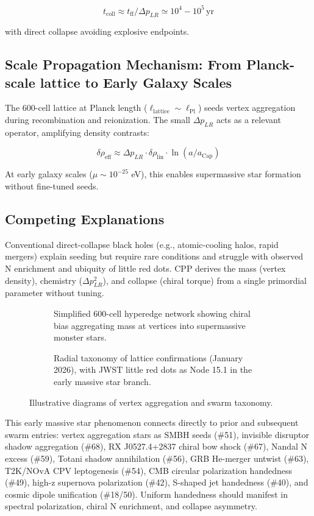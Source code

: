 \documentclass[11pt]{article}
\begin{document}
\[
t_{\text{coll}} \approx t_{\text{ff}} / \Delta p_{LR} \simeq 10^4 - 10^5 \, \text{yr}
\]

with direct collapse avoiding explosive endpoints.

\subsection{Scale Propagation Mechanism: From Planck-scale lattice to Early Galaxy Scales}
The 600-cell lattice at Planck length ($\ell_{\text{lattice}} \sim \ell_{\text{Pl}}$) seeds vertex aggregation during recombination and reionization. The small $\Delta p_{LR}$ acts as a relevant operator, amplifying density contrasts:

\[
\delta \rho_{\text{eff}} \approx \Delta p_{LR} \cdot \delta \rho_{\text{lin}} \cdot \ln(a / a_{\text{Cap}})
\]

At early galaxy scales ($\mu \sim 10^{-25}$ eV), this enables supermassive star formation without fine-tuned seeds.

\subsection{Competing Explanations}
Conventional direct-collapse black holes (e.g., atomic-cooling halos, rapid mergers) explain seeding but require rare conditions and struggle with observed N enrichment and ubiquity of little red dots. CPP derives the mass (vertex density), chemistry ($\Delta p_{LR}^2$), and collapse (chiral torque) from a single primordial parameter without tuning.

\begin{figure}[htbp]
\centering
\begin{subfigure}{0.45\textwidth}
\centering
\caption{Simplified 600-cell hyperedge network showing chiral bias aggregating mass at vertices into supermassive monster stars.}
\label{fig:vertex-agg}
\end{subfigure}
\hfill
\begin{subfigure}{0.45\textwidth}
\centering
\caption{Radial taxonomy of lattice confirmations (January 2026), with JWST little red dots as Node 15.1 in the early massive star branch.}
\label{fig:taxonomy}
\end{subfigure}
\caption{Illustrative diagrams of vertex aggregation and swarm taxonomy.}
\end{figure}

This early massive star phenomenon connects directly to prior and subsequent swarm entries: vertex aggregation stars as SMBH seeds (\#51), invisible disruptor shadow aggregation (\#68), RX J0527.4+2837 chiral bow shock (\#67), Nandal N excess (\#59), Totani shadow annihilation (\#56), GRB He-merger untwist (\#63), T2K/NOvA CPV leptogenesis (\#54), CMB circular polarization handedness (\#49), high-z supernova polarization (\#42), S-shaped jet handedness (\#40), and cosmic dipole unification (\#18/50). Uniform handedness should manifest in spectral polarization, chiral N enrichment, and collapse asymmetry.
\end{document}
